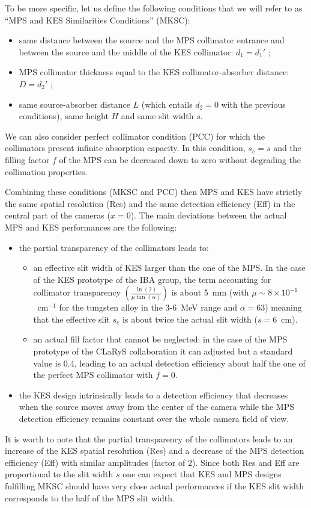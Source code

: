\documentclass[a4paper,english,12pt]{article}
\begin{document}
To be more specific, let us define the following conditions that we will refer to as \enquote{MPS and KES Similarities Conditions} (MKSC):
\begin{itemize}
	\item same distance between the source and the MPS collimator entrance and between the source and the middle of the KES collimator: $d_1=d_1'$ ;
	\item MPS collimator thickness equal to the KES collimator-absorber distance: $D=d_2'$ ;
	\item same source-absorber distance $L$ (which entails $d_2=0$ with the previous conditions), same height $H$ and same slit width $s$.	
\end{itemize}
We can also consider perfect collimator condition (PCC) for which the collimators present infinite absorption capacity. In this condition, $s_e=s$ and the filling factor $f$ of the MPS can be decreased down to zero without degrading the collimation properties.

Combining these conditions (MKSC and PCC) then MPS and KES have strictly the same spatial resolution (Res) and the same detection efficiency (Eff) in the central part of the cameras ($x=0$). The main deviations between the actual MPS and KES performances are the following: 
\begin{itemize}
	\item the partial transparency of the collimators leads to:
	\begin{itemize}
		\item an effective slit width of KES larger than the one of the MPS. In the case of the KES prototype of the IBA group, the term accounting for collimator transparency $\left(\frac{\ln(2)}{\mu \tan(\alpha)}\right)$ is about 5~mm (with $\mu\sim 8\times10^{-1}$~cm$^{-1}$ for the tungsten alloy in the 3-6~MeV range and $\alpha=63$\textdegree) meaning that the effective slit $s_e$ is about twice the actual slit width ($s=6$~cm).
		\item an actual fill factor that cannot be neglected: in the case of the MPS prototype of the CLaRyS collaboration it can adjusted but a standard value is 0.4, leading to an actual detection efficiency about half the one of the perfect MPS collimator with $f=0$. 
	\end{itemize}
	\item the KES design intrinsically leads to a detection efficiency that decreases when the source moves away from the center of the camera while the MPS detection efficiency remains constant over the whole camera field of view.
\end{itemize}
It is worth to note that the partial transparency of the collimators leads to an increase of the KES spatial resolution (Res) and a decrease of the MPS detection efficiency (Eff) with similar amplitudes (factor of 2). Since both Res and Eff are proportional to the slit width $s$ one can expect that KES and MPS designs fulfilling MKSC should have very close actual performances if the KES slit width corresponds to the half of the MPS slit width. 
\end{document}
